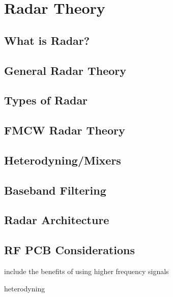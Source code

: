 \chapter{Radar Theory
\label{Radar Theory}}

\section{What is Radar?}

\section{General Radar Theory}

\section{Types of Radar}

\section{FMCW Radar Theory}

\section{Heterodyning/Mixers}

\section{Baseband Filtering}

\section{Radar Architecture}

\section{RF PCB Considerations}

include the benefits of using higher frequency signals

heterodyning